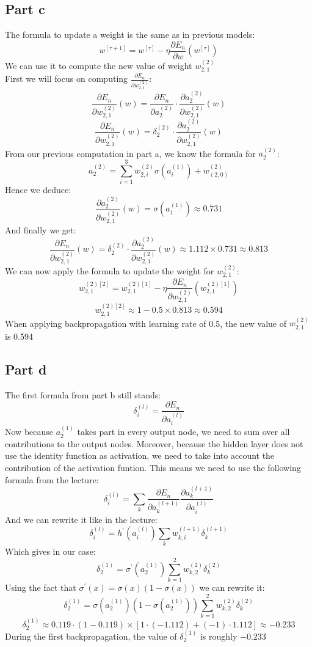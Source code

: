\documentclass[a4paper, 10pt]{article}
\begin{document}
\subsection{Part c}
The formula to update a weight is the same as in previous models:
$$
w^{[\tau +1]} = w^{[\tau]} - \eta \frac{\partial E_n}{\partial w}(w^{[\tau]})
$$
We can use it to compute the new value of weight $w_{2,1}^{(2)}$ 
\\
First we will focus on computing $\frac{\partial E_n}{\partial w_{2,1}^{(2)}}$:
$$
\frac{\partial E_n}{\partial w_{2,1}^{(2)}}(w) = \frac{\partial E_n}{\partial a_2^{(2)}} \cdot \frac{\partial a_2^{(2)}}{\partial w_{2,1}^{(2)}}(w)
$$
$$
\frac{\partial E_n}{\partial w_{2,1}^{(2)}}(w) = \delta_2^{(2)} \cdot \frac{\partial a_2^{(2)}}{\partial w_{2,1}^{(2)}}(w) 
$$
From our previous computation in part a, we know the formula for $a_2^{(2)}$:
$$
a_2^{(2)} = \sum_{i=1}^3 w_{2,i}^{(2)}\sigma(a_i^{(1)}) + w_{(2,0)}^{(2)}
$$
Hence we deduce:
$$
\frac{\partial a_2^{(2)}}{\partial w_{2,1}^{(2)}}(w) = \sigma(a_1^{(1)}) \approx 0.731
$$
And finally we get:
$$
\frac{\partial E_n}{\partial w_{2,1}^{(2)}}(w) = \delta_2^{(2)} \cdot \frac{\partial a_2^{(2)}}{\partial w_{2,1}^{(2)}}(w) \approx 1.112 \times 0.731 \approx 0.813 
$$
We can now apply the formula to update the weight for $w_{2,1}^{(2)}$:
$$
w_{2,1}^{(2)[2]} = w_{2,1}^{(2)[1]} - \eta \frac{\partial E_n}{\partial w_{2,1}^{(2)}}(w_{2,1}^{(2)[1]}) 
$$
$$
w_{2,1}^{(2)[2]} \approx 1 - 0.5 \times 0.813 \approx 0.594
$$
When applying backpropagation with learning rate of 0.5, the new value of $w_{2,1}^{(2)}$ is 0.594
\subsection{Part d}
The first formula from part b still stands:
$$
\delta_i^{(l)} = \frac{\partial E_n}{\partial a_i^{(l)}} 
$$
Now because $a_2^{(1)}$ takes part in every output node, we need to sum over all contributions to the output nodes.
Moreover, because the hidden layer does not use the identity function as activation, we need to take into account the contribution
of the activation funtion. This means we need to use the following formula from the lecture:
$$
\delta_i^{(l)} = \sum_k \frac{\partial E_n}{\partial a_k^{(l+1)}}\frac{\partial a_k^{(l+1)}}{\partial a_i^{(l)}}
$$
And we can rewrite it like in the lecture:
$$
\delta_i^{(l)} = h^\prime(a_i^{(l)})\sum_k w_{k,i}^{(l+1)}\delta_k^{(l+1)} 
$$
Which gives in our case:
$$
\delta_2^{(1)} = \sigma^\prime(a_2^{(1)})\sum_{k=1}^2 w_{k,2}^{(2)}\delta_k^{(2)} 
$$
Using the fact that $\sigma^\prime(x) = \sigma(x)(1-\sigma(x))$ we can rewrite it:
$$
\delta_2^{(1)} = \sigma(a_2^{(1)})(1-\sigma(a_2^{(1)}))\sum_{k=1}^2 w_{k,2}^{(2)}\delta_k^{(2)} 
$$
$$
\delta_2^{(1)} \approx 0.119\cdot(1-0.119)\times [1\cdot(-1.112)+(-1)\cdot1.112] \approx -0.233
$$
During the first backpropagation, the value of $\delta_2^{(1)}$ is roughly $-0.233$
\end{document}
